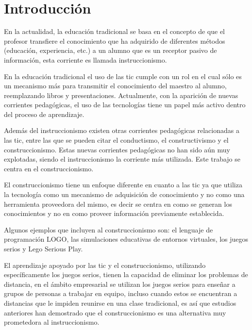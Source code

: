 \chapter{Introducción}
\label{chap:introduccion}




En la actualidad, la educación tradicional se basa en el
concepto de que el profesor transfiere el conocimiento que ha adquirido de
diferentes métodos (educación, experiencia, etc.) a un alumno que es un receptor
pasivo de información, esta corriente es llamada instruccionismo\cite{laptop:instructionism}. 

En la educación tradicional el uso de las \Gls{tic} cumple con
un rol en el cual sólo es un mecanismo más para transmitir el conocimiento del
maestro al alumno, reemplazando libros y presentaciones. Actualmente, con la 
aparición de nuevas corrientes pedagógicas, el uso de las tecnologías tiene un 
papel más activo dentro del proceso de aprendizaje.

Además del instruccionismo existen otras corrientes pedagógicas relacionadas a
las \Gls{tic}, entre las que se pueden citar el conductismo, el constructivismo
y el construccionismo. Estas nuevas corrientes pedagógicas no han sido aún muy explotadas, 
siendo el instruccionismo la corriente más utilizada. Este trabajo se centra en el 
construccionismo.

El construccionismo tiene un enfoque diferente en
cuanto a las \Gls{tic} ya que utiliza la tecnología como un mecanismo de
adquisición de conocimiento y no como una herramienta proveedora del
mismo\cite{sasha:construtivism}, es decir se centra en como se generan los
conocimientos y no en como proveer información previamente establecida. 

Algunos ejemplos que incluyen al construccionismo son: 
el lenguaje de programación LOGO, las simulaciones educativas de entornos virtuales, 
los juegos serios y Lego Serious Play.

El aprendizaje apoyado por las \Gls{tic} y el construccionismo, utilizando
específicamente los juegos serios, tienen la capacidad de eliminar los problemas
de distancia, en el ámbito empresarial se utilizan los juegos serios para
enseñar a grupos de personas a trabajar en equipo, incluso cuando estos se
encuentran a distancias que le impiden reunirse en una clase
tradicional\cite{mariluz:seiousgames}, es así que estudios anteriores han
demostrado que el construccionismo es una alternativa muy prometedora al
instruccionismo\cite{sasha:construtivism}. 
   
